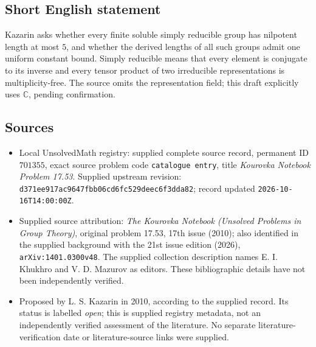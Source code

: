 \documentclass[11pt]{article}
\newcommand{\C}{\mathbb{C}}
\begin{document}
\subsection{Short English statement}
Kazarin asks whether every finite soluble simply reducible group has nilpotent length at most \(5\), and whether the derived lengths of all such groups admit one uniform constant bound. Simply reducible means that every element is conjugate to its inverse and every tensor product of two irreducible representations is multiplicity-free. The source omits the representation field; this draft explicitly uses \(\C\), pending confirmation.
\subsection{Sources}
\begin{itemize}
\item Local UnsolvedMath registry: supplied complete source record, permanent ID \(701355\), exact source problem code \texttt{catalogue entry}, title \emph{Kourovka Notebook Problem 17.53}. Supplied upstream revision: \texttt{d371ee917ac9647fbb06cd6fc529deec6f3dda82}; record updated \texttt{2026-10-16T14:00:00Z}.
\item Supplied source attribution: \emph{The Kourovka Notebook (Unsolved Problems in Group Theory)}, original problem 17.53, 17th issue (2010); also identified in the supplied background with the 21st issue edition (2026), \texttt{arXiv:1401.0300v48}. The supplied collection description names E. I. Khukhro and V. D. Mazurov as editors. These bibliographic details have not been independently verified.
\item Proposed by L. S. Kazarin in 2010, according to the supplied record. Its status is labelled \emph{open}; this is supplied registry metadata, not an independently verified assessment of the literature. No separate literature-verification date or literature-source links were supplied.
\end{itemize}
\end{document}
